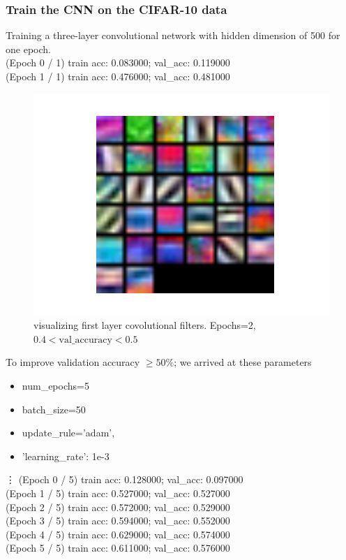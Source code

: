 \documentclass{article}
\begin{document}
\subsubsection{Train the CNN on the CIFAR-10 data}
{\footnotesize
Training a three-layer convolutional network with hidden dimension of 500 for one epoch.\\
(Epoch 0 / 1) train acc: 0.083000; val\_acc: 0.119000\\
(Epoch 1 / 1) train acc: 0.476000; val\_acc: 0.481000\\
}

\begin{figure}[H]
\centering
\includegraphics[width=1.0\linewidth]{./figure_3_2_6}
\caption{visualizing first layer covolutional filters. Epochs=2, $0.4<\text{val\_accuracy}<0.5$}
\label{fig:3_2_6}
\end{figure}

{\footnotesize
To improve validation accuracy $\geq 50\%$; we arrived at these parameters
\begin{itemize}
	\item num\_epochs=5
	\item batch\_size=50
	\item update\_rule='adam',
    \item 'learning\_rate': 1e-3
\end{itemize}

\vdots
\noindent
(Epoch 0 / 5) train acc: 0.128000; val\_acc: 0.097000\\
(Epoch 1 / 5) train acc: 0.527000; val\_acc: 0.527000\\
(Epoch 2 / 5) train acc: 0.572000; val\_acc: 0.529000\\
(Epoch 3 / 5) train acc: 0.594000; val\_acc: 0.552000\\
(Epoch 4 / 5) train acc: 0.629000; val\_acc: 0.574000\\
(Epoch 5 / 5) train acc: 0.611000; val\_acc: 0.576000\\
}
\end{document}
